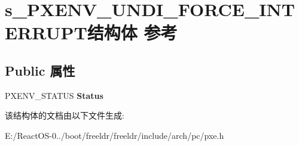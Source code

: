 \hypertarget{structs___p_x_e_n_v___u_n_d_i___f_o_r_c_e___i_n_t_e_r_r_u_p_t}{}\section{s\+\_\+\+P\+X\+E\+N\+V\+\_\+\+U\+N\+D\+I\+\_\+\+F\+O\+R\+C\+E\+\_\+\+I\+N\+T\+E\+R\+R\+U\+P\+T结构体 参考}
\label{structs___p_x_e_n_v___u_n_d_i___f_o_r_c_e___i_n_t_e_r_r_u_p_t}
\subsection*{Public 属性}
\begin{DoxyCompactItemize}
\item 
\mbox{\label{structs___p_x_e_n_v___u_n_d_i___f_o_r_c_e___i_n_t_e_r_r_u_p_t_a098d3b1abeb81cc0aa1e06a02873b41f}} 
P\+X\+E\+N\+V\+\_\+\+S\+T\+A\+T\+US {\bfseries Status}
\end{DoxyCompactItemize}


该结构体的文档由以下文件生成\+:\begin{DoxyCompactItemize}
\item 
E\+:/\+React\+O\+S-\/0../boot/freeldr/freeldr/include/arch/pc/pxe.\+h\end{DoxyCompactItemize}
